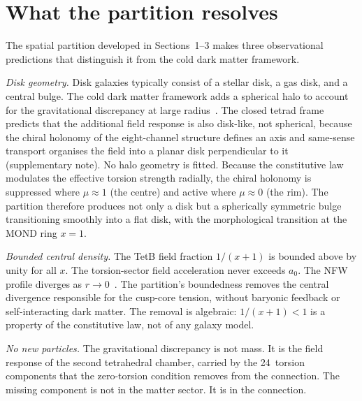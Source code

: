 \documentclass[twocolumn]{iopjournal}
\begin{document}

\section{What the partition resolves}

The spatial partition developed in Sections~1--3 makes three
observational predictions that distinguish it from the cold
dark matter framework.

\textit{Disk geometry.}  Disk galaxies typically consist of a
stellar disk, a gas disk, and a central bulge.  The cold dark matter
framework adds a spherical halo to account for the
gravitational discrepancy at large
radius~\cite{NFW1996}.  The closed tetrad frame predicts that
the additional field response is also disk-like, not spherical,
because the chiral holonomy of the eight-channel structure
defines an axis and same-sense transport organises the field
into a planar disk perpendicular to it (supplementary note).
No halo geometry is fitted.  Because the constitutive law
modulates the effective torsion strength radially, the chiral
holonomy is suppressed where $\mu \approx 1$ (the centre) and
active where $\mu \approx 0$ (the rim).  The partition
therefore produces not only a disk but a spherically symmetric
bulge transitioning smoothly into a flat disk, with the
morphological transition at the MOND ring $x = 1$.

\textit{Bounded central density.}  The TetB field fraction
$1/(x{+}1)$ is bounded above by unity for all $x$.  The
torsion-sector field acceleration never exceeds $a_0$.  The NFW
profile diverges as $r \to 0$~\cite{NFW1996}.  The partition's
boundedness removes the central divergence responsible for the
cusp-core tension, without baryonic
feedback or self-interacting dark matter.  The removal is
algebraic: $1/(x{+}1) < 1$ is a property of the constitutive
law, not of any galaxy model.

\textit{No new particles.}  The gravitational discrepancy is
not mass.  It is the field response of the second tetrahedral
chamber, carried by the 24~torsion components that the
zero-torsion condition removes from the connection.  The
missing component is not in the matter sector.  It is in the
connection.
\end{document}
